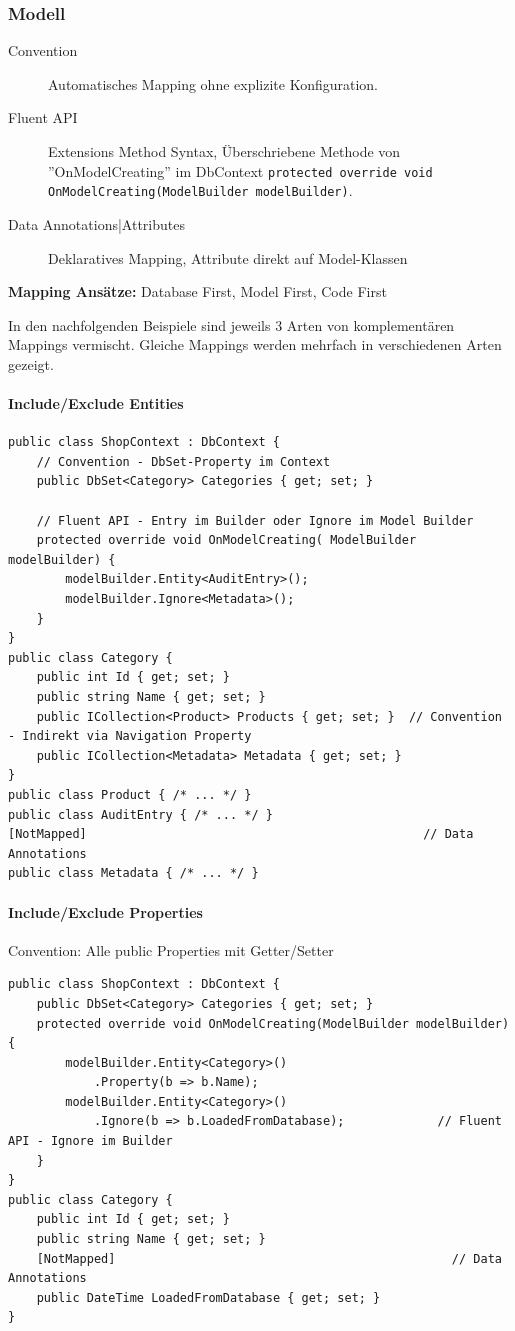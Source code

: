 \documentclass[
a4paper,
oneside,
10pt,
fleqn,
headsepline,
toc=listofnumbered, 
bibliography=totocnumbered]{scrartcl}
\begin{document}
\subsubsection{Modell}
\begin{description}
	\item[Convention] Automatisches Mapping ohne explizite Konfiguration.
	\item[Fluent API] Extensions Method Syntax, Überschriebene Methode von ''OnModelCreating'' im DbContext \lstinline|protected override void OnModelCreating(ModelBuilder modelBuilder)|.
	\item[Data Annotations|Attributes] Deklaratives Mapping, Attribute direkt auf Model-Klassen
\end{description}

\textbf{Mapping Ansätze:} Database First, Model First, Code First

In den nachfolgenden Beispiele sind jeweils 3 Arten von komplementären Mappings vermischt. Gleiche Mappings werden mehrfach in verschiedenen Arten gezeigt.

\paragraph{Include/Exclude Entities}
\begin{lstlisting}
public class ShopContext : DbContext {
    // Convention - DbSet-Property im Context
    public DbSet<Category> Categories { get; set; }
    
    // Fluent API - Entry im Builder oder Ignore im Model Builder
    protected override void OnModelCreating( ModelBuilder modelBuilder) {
        modelBuilder.Entity<AuditEntry>();          
        modelBuilder.Ignore<Metadata>();
    }
}
public class Category {
    public int Id { get; set; }
    public string Name { get; set; }
    public ICollection<Product> Products { get; set; }  // Convention - Indirekt via Navigation Property
    public ICollection<Metadata> Metadata { get; set; }
}
public class Product { /* ... */ }
public class AuditEntry { /* ... */ }
[NotMapped]                                               // Data Annotations
public class Metadata { /* ... */ }
\end{lstlisting}

\paragraph{Include/Exclude Properties}
Convention: Alle public Properties mit Getter/Setter
\begin{lstlisting}
public class ShopContext : DbContext {
    public DbSet<Category> Categories { get; set; }
    protected override void OnModelCreating(ModelBuilder modelBuilder) {
        modelBuilder.Entity<Category>()
            .Property(b => b.Name);                     
        modelBuilder.Entity<Category>()
            .Ignore(b => b.LoadedFromDatabase);             // Fluent API - Ignore im Builder
    }
}
public class Category {
    public int Id { get; set; }
    public string Name { get; set; }
    [NotMapped]                                               // Data Annotations
    public DateTime LoadedFromDatabase { get; set; }
}
\end{lstlisting}
\end{document}
